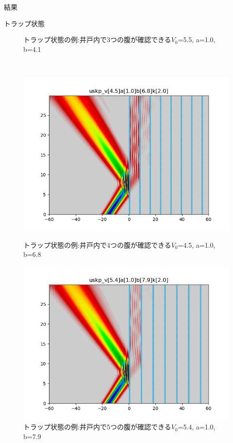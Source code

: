 \documentclass[a4paper, lualatex]{bxjsarticle}
\begin{document}
\begin{section}{結果}
\begin{subsection}{トラップ状態}
\begin{figure}[h]
\begin{minipage}{0.5\hsize}
                \caption{トラップ状態の例:井戸内で3つの腹が確認できる$V_0$=5.5, a=1.0, b=4.1}
                \label{trap3}
            \end{minipage}\\
            \begin{minipage}{0.5\hsize}
                \centering
                \includegraphics[width=0.9\hsize]{trap2.png}
                \caption{トラップ状態の例:井戸内で4つの腹が確認できる$V_0$=4.5, a=1.0, b=6.8}
                \label{trap4}
            \end{minipage}
            \begin{minipage}{0.5\hsize}
                \centering
                \includegraphics[width=0.9\hsize]{trap3.png}
                \caption{トラップ状態の例:井戸内で5つの腹が確認できる$V_0$=5.4, a=1.0, b=7.9}
                \label{trap5}
            \end{minipage}

\end{figure}
\end{subsection}
\end{section}
\end{document}
